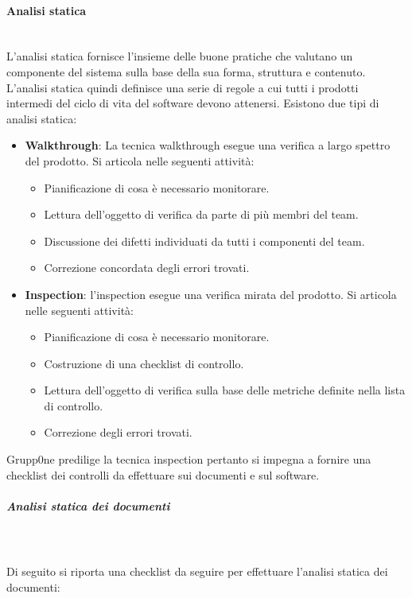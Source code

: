 \documentclass[../norme-di-progetto.tex]{subfiles}
\begin{document}
\paragraph{Analisi statica}\mbox{}\\
\label{par:analisi statica}
L'analisi statica  fornisce l'insieme delle buone pratiche che valutano un componente del sistema sulla base della sua forma, struttura e contenuto. L'analisi statica quindi definisce una serie di regole  a cui tutti i prodotti intermedi del ciclo di vita del software devono attenersi. Esistono due tipi di analisi statica:
\begin{itemize} 
	\item \textbf{Walkthrough}: La tecnica walkthrough esegue una verifica a largo spettro del prodotto. Si articola nelle seguenti attività:
	\begin{itemize}
		\item Pianificazione di cosa è necessario monitorare.
		\item Lettura dell'oggetto di verifica da parte di più membri del team.
		\item Discussione dei difetti individuati da tutti i componenti del team.
		\item Correzione concordata degli errori trovati.
	\end{itemize}
	\item \textbf{Inspection}: l'inspection esegue una verifica mirata del prodotto. Si articola nelle seguenti attività:
	\begin{itemize}
		\item Pianificazione di cosa è necessario monitorare.
		\item Costruzione di una checklist di controllo.
		\item Lettura dell'oggetto di verifica sulla base delle metriche definite nella lista di controllo.
		\item Correzione degli errori trovati.
	\end{itemize}
\end{itemize}
Grupp0ne predilige la tecnica inspection pertanto si impegna a fornire una checklist dei controlli da effettuare sui documenti e sul software.
\subparagraph{Analisi statica dei documenti}\mbox{}\\
\label{subp:analisi statica dei documenti}
\\ Di seguito si riporta una checklist da seguire per effettuare l'analisi statica dei documenti:
\end{document}
